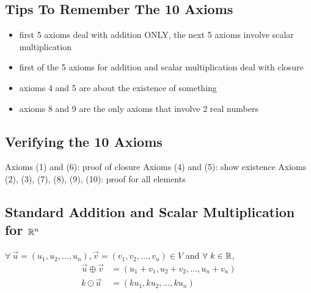 \subsection*{Tips To Remember The 10 Axioms}
\begin{itemize}
  \item first 5 axioms deal with addition ONLY, the next 5 axioms involve scalar multiplication
  \item first of the 5 axioms for addition and scalar multiplication deal with closure
  \item axioms 4 and 5 are about the existence of something
  \item axioms 8 and 9 are the only axioms that involve 2 real numbers
\end{itemize}
\subsection*{Verifying the 10 Axioms}
\begin{itemize}
   Axioms (1) and (6): proof of closure
   Axioms (4) and (5): show existence
   Axioms (2), (3), (7), (8), (9), (10): proof for all elements
\end{itemize}
\subsection*{Standard Addition and Scalar Multiplication for $\mathbb{R}^n$}
$\forall~\vec{u} = (u_1, u_2, \ldots, u_n), \vec{v} = (v_1, v_2, \ldots, v_n) \in V$ and $\forall~k \in \mathbb{R}$,
\begin{align*}
  \vec{u} \oplus \vec{v} & = (u_1 + v_1, u_2 + v_2, \ldots, u_n + v_n) \\
  k \odot \vec{u}        & = (ku_1, ku_2, \ldots, ku_n)
\end{align*}